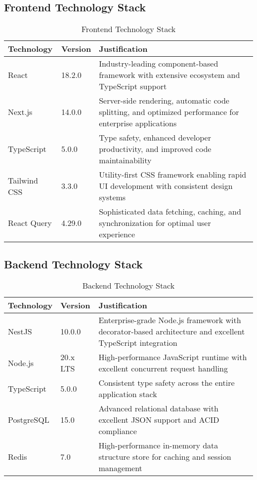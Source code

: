 \subsection{Frontend Technology Stack}

\begin{table}[H]
\centering
\caption{Frontend Technology Stack}
\begin{tabular}{|p{3cm}|p{4cm}|p{6cm}|}
\hline
\textbf{Technology} & \textbf{Version} & \textbf{Justification} \\
\hline
React & 18.2.0 & Industry-leading component-based framework with extensive ecosystem and TypeScript support \\
\hline
Next.js & 14.0.0 & Server-side rendering, automatic code splitting, and optimized performance for enterprise applications \\
\hline
TypeScript & 5.0.0 & Type safety, enhanced developer productivity, and improved code maintainability \\
\hline
Tailwind CSS & 3.3.0 & Utility-first CSS framework enabling rapid UI development with consistent design systems \\
\hline
React Query & 4.29.0 & Sophisticated data fetching, caching, and synchronization for optimal user experience \\
\hline
\end{tabular}
\end{table}

\subsection{Backend Technology Stack}

\begin{table}[H]
\centering
\caption{Backend Technology Stack}
\begin{tabular}{|p{3cm}|p{4cm}|p{6cm}|}
\hline
\textbf{Technology} & \textbf{Version} & \textbf{Justification} \\
\hline
NestJS & 10.0.0 & Enterprise-grade Node.js framework with decorator-based architecture and excellent TypeScript integration \\
\hline
Node.js & 20.x LTS & High-performance JavaScript runtime with excellent concurrent request handling \\
\hline
TypeScript & 5.0.0 & Consistent type safety across the entire application stack \\
\hline
PostgreSQL & 15.0 & Advanced relational database with excellent JSON support and ACID compliance \\
\hline
Redis & 7.0 & High-performance in-memory data structure store for caching and session management \\
\hline
\end{tabular}
\end{table}

